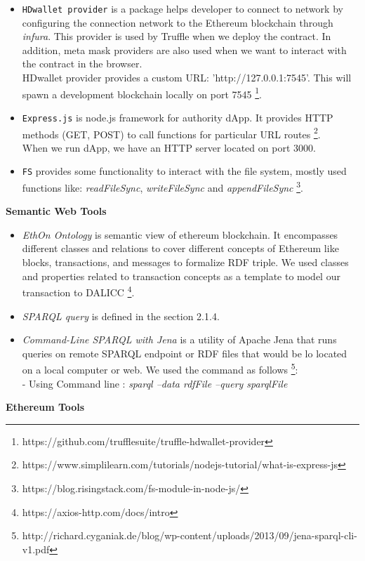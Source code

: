 \begin{itemize}
\item \texttt{HDwallet provider} is a package helps developer to connect to network by configuring the connection network to the Ethereum blockchain through \textit{infura}. This provider is used by Truffle when we deploy the contract. In addition, meta mask providers are also used when we want to interact with the contract in the browser.\\
HDwallet provider provides a custom URL: 'http://127.0.0.1:7545'. This will spawn a development blockchain locally on port 7545 \footnote{https://github.com/trufflesuite/truffle-hdwallet-provider}. \\
\item \texttt{Express.js} is node.js framework for authority dApp. It provides HTTP methods (GET, POST) to call functions for particular URL routes \footnote{https://www.simplilearn.com/tutorials/nodejs-tutorial/what-is-express-js}. \\ 
When we run dApp, we have an HTTP server located on port 3000. \\
\item \texttt{FS} provides some functionality to interact with the file system, mostly used functions like: \textit{readFileSync}, \textit{writeFileSync} and \textit{appendFileSync} \footnote{https://blog.risingstack.com/fs-module-in-node-js/}. \\
\end{itemize}

\textbf{Semantic Web Tools}\\
\begin{itemize}
	\item \textit{EthOn Ontology} is semantic view of ethereum blockchain. It encompasses different classes and relations to cover different concepts of Ethereum like blocks, transactions, and messages to formalize RDF triple. We used classes and properties related to transaction concepts as a template to model our transaction to DALICC \footnote{https://axios-http.com/docs/intro}.
	\item \textit{SPARQL query} is defined in the section 2.1.4.
	\item \textit{Command-Line SPARQL with Jena} is a utility of Apache Jena that runs queries on remote SPARQL endpoint or RDF files that would be lo located on a local computer or web. We used the command as follows \footnote{http://richard.cyganiak.de/blog/wp-content/uploads/2013/09/jena-sparql-cli-v1.pdf}:\\
	 - Using Command line : \textit{sparql --data rdfFile --query sparqlFile} 
\end{itemize}
\textbf{Ethereum Tools}

